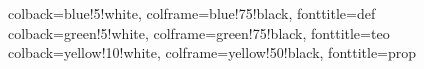 \usepackage[most]{tcolorbox}
\usepackage{amsmath, amsthm, amssymb}

\geometry{margin=2.5cm}


%
{colback=blue!5!white, colframe=blue!75!black, fonttitle=\bfseries}{def}
%
{colback=green!5!white, colframe=green!75!black, fonttitle=\bfseries}{teo}
%
{colback=yellow!10!white, colframe=yellow!50!black, fonttitle=\bfseries}{prop}

\newcommand{\N}{\mathbb{N}}
\newcommand{\Z}{\mathbb{Z}}
\newcommand{\Q}{\mathbb{Q}}
\newcommand{\R}{\mathbb{R}}
\newcommand{\C}{\mathbb{C}}
